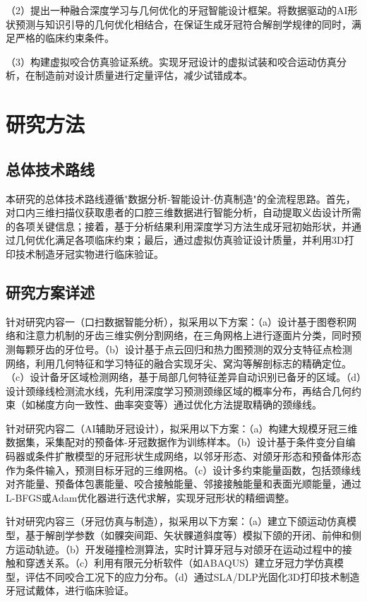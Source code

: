 \documentclass[12pt,hyperref,a4paper,UTF8]{ctexart}
\begin{document}
（2）提出一种融合深度学习与几何优化的牙冠智能设计框架。将数据驱动的AI形状预测与知识引导的几何优化相结合，在保证生成牙冠符合解剖学规律的同时，满足严格的临床约束条件。

（3）构建虚拟咬合仿真验证系统。实现牙冠设计的虚拟试装和咬合运动仿真分析，在制造前对设计质量进行定量评估，减少试错成本。

\section{研究方法}

\subsection{总体技术路线}

本研究的总体技术路线遵循"数据分析-智能设计-仿真制造"的全流程思路。首先，对口内三维扫描仪获取患者的口腔三维数据进行智能分析，自动提取义齿设计所需的各项关键信息；接着，基于分析结果利用深度学习方法生成牙冠初始形状，并通过几何优化满足各项临床约束；最后，通过虚拟仿真验证设计质量，并利用3D打印技术制造牙冠实物进行临床验证。

\subsection{研究方案详述}

针对研究内容一（口扫数据智能分析），拟采用以下方案：（a）设计基于图卷积网络和注意力机制的牙齿三维实例分割网络，在三角网格上进行逐面片分类，同时预测每颗牙齿的牙位号。（b）设计基于点云回归和热力图预测的双分支特征点检测网络，利用几何特征和学习特征的融合实现牙尖、窝沟等解剖标志的精确定位。（c）设计备牙区域检测网络，基于局部几何特征差异自动识别已备牙的区域。（d）设计颈缘线检测流水线，先利用深度学习预测颈缘区域的概率分布，再结合几何约束（如梯度方向一致性、曲率突变等）通过优化方法提取精确的颈缘线。

针对研究内容二（AI辅助牙冠设计），拟采用以下方案：（a）构建大规模牙冠三维数据集，采集配对的预备体-牙冠数据作为训练样本。（b）设计基于条件变分自编码器或条件扩散模型的牙冠形状生成网络，以邻牙形态、对颌牙形态和预备体形态作为条件输入，预测目标牙冠的三维网格。（c）设计多约束能量函数，包括颈缘线对齐能量、预备体包裹能量、咬合接触能量、邻接接触能量和表面光顺能量，通过L-BFGS或Adam优化器进行迭代求解，实现牙冠形状的精细调整。

针对研究内容三（牙冠仿真与制造），拟采用以下方案：（a）建立下颌运动仿真模型，基于解剖学参数（如髁突间距、矢状髁道斜度等）模拟下颌的开闭、前伸和侧方运动轨迹。（b）开发碰撞检测算法，实时计算牙冠与对颌牙在运动过程中的接触和穿透关系。（c）利用有限元分析软件（如ABAQUS）建立牙冠力学仿真模型，评估不同咬合工况下的应力分布。（d）通过SLA/DLP光固化3D打印技术制造牙冠试戴体，进行临床验证。
\end{document}
